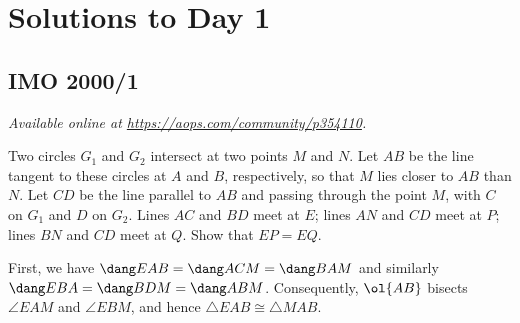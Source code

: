\documentclass[11pt]{scrartcl}
\begin{document}
\section{Solutions to Day 1}
\subsection{IMO 2000/1}
\textsl{Available online at \url{https://aops.com/community/p354110}.}
\begin{mdframed}[style=mdpurplebox,frametitle={Problem statement}]
Two circles $G_1$ and $G_2$ intersect at two points $M$ and $N$.
Let $AB$ be the line tangent to these circles at $A$ and $B$,
respectively, so that $M$ lies closer to $AB$ than $N$.
Let $CD$ be the line parallel to $AB$
and passing through the point $M$,
with $C$ on $G_1$ and $D$ on $G_2$.
Lines $AC$ and $BD$ meet at $E$; lines $AN$ and $CD$ meet at $P$;
lines $BN$ and $CD$ meet at $Q$.
Show that $EP = EQ$.
\end{mdframed}
First, we have $\dang EAB = \dang ACM = \dang BAM$
and similarly $\dang EBA = \dang BDM = \dang ABM$.
Consequently, $\ol{AB}$ bisects $\angle EAM$ and $\angle EBM$,
and hence $\triangle EAB \cong \triangle MAB$.
\end{document}
